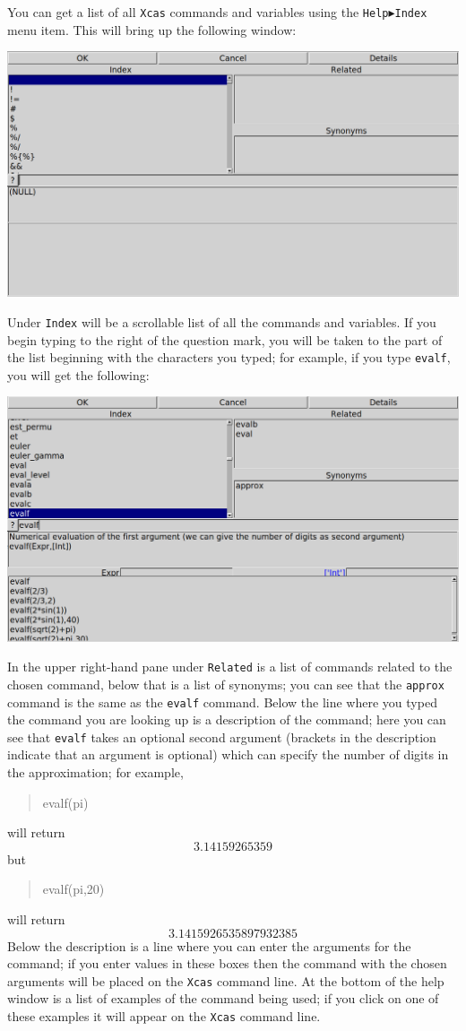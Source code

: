\documentclass{article}
\newcommand{\xcasin}[1]
{\begin{quote}\ttfamily
#1
\end{quote}}
\newcommand{\xcasout}[1]
{\begin{equation*}
#1
\end{equation*}}
\begin{document}
You can get a list of all \texttt{Xcas} commands and variables using the
\texttt{Help$\blacktriangleright$Index} menu item.  This will bring up
the following window:
\begin{center}
\includegraphics[width=\textwidth]{xcas-help-index.png}
\end{center}
Under \texttt{Index} will be a scrollable list of all the commands and
variables.  
If you begin typing to the right of the question mark, you will be
taken to the part of the list beginning with the characters you typed;
for example, if you type \texttt{evalf}, you will get the following:
\begin{center}
\includegraphics[width=\textwidth]{xcas-help-evalf.png}
\end{center}
In the upper right-hand pane under \texttt{Related} is a list of
commands related to the chosen command, below that is a list of
synonyms; you can see that the \texttt{approx} command is the same as
the \texttt{evalf} command.  Below the line where you typed the
command you are looking up is a description of the command; here you
can see that \texttt{evalf} takes an optional second argument
(brackets in the description indicate that an argument is optional)
which can specify the number of digits in the approximation; for
example, 
\xcasin{evalf(pi)}
will return
\xcasout{3.14159265359}
but 
\xcasin{evalf(pi,20)}
will return
\xcasout{3.1415926535897932385}
Below the description is a line where you can enter the arguments for
the command; if you enter values in these boxes then the command with
the chosen arguments will be placed on the \texttt{Xcas} command line.
At the bottom of the help window is a list of examples of the command
being used; if you click on one of these examples it will appear on
the \texttt{Xcas} command line.
\end{document}
